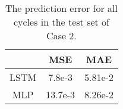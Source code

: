 \begin{table}[ht!]
    \centering
    \caption{The prediction error for all cycles in the test set of Case 2.}
    \begin{tabular}{c | c c}
                    & \ac{MSE}  & \ac{MAE}  \\ \hline
        \ac{LSTM}   & 7.8e-3         & 5.81e-2         \\
        \ac{MLP}    & 13.7e-3        & 8.26e-2
    \end{tabular}
    \label{tab:case2-test-eval}
\end{table}
